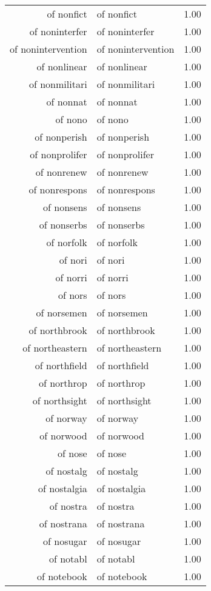 \begin{table}[ht]
\begin{tabular}{rlr}
  of nonfict & of nonfict & 1.00 \\ 
  of noninterfer & of noninterfer & 1.00 \\ 
  of nonintervention & of nonintervention & 1.00 \\ 
  of nonlinear & of nonlinear & 1.00 \\ 
  of nonmilitari & of nonmilitari & 1.00 \\ 
  of nonnat & of nonnat & 1.00 \\ 
  of nono & of nono & 1.00 \\ 
  of nonperish & of nonperish & 1.00 \\ 
  of nonprolifer & of nonprolifer & 1.00 \\ 
  of nonrenew & of nonrenew & 1.00 \\ 
  of nonrespons & of nonrespons & 1.00 \\ 
  of nonsens & of nonsens & 1.00 \\ 
  of nonserbs & of nonserbs & 1.00 \\ 
  of norfolk & of norfolk & 1.00 \\ 
  of nori & of nori & 1.00 \\ 
  of norri & of norri & 1.00 \\ 
  of nors & of nors & 1.00 \\ 
  of norsemen & of norsemen & 1.00 \\ 
  of northbrook & of northbrook & 1.00 \\ 
  of northeastern & of northeastern & 1.00 \\ 
  of northfield & of northfield & 1.00 \\ 
  of northrop & of northrop & 1.00 \\ 
  of northsight & of northsight & 1.00 \\ 
  of norway & of norway & 1.00 \\ 
  of norwood & of norwood & 1.00 \\ 
  of nose & of nose & 1.00 \\ 
  of nostalg & of nostalg & 1.00 \\ 
  of nostalgia & of nostalgia & 1.00 \\ 
  of nostra & of nostra & 1.00 \\ 
  of nostrana & of nostrana & 1.00 \\ 
  of nosugar & of nosugar & 1.00 \\ 
  of notabl & of notabl & 1.00 \\ 
  of notebook & of notebook & 1.00 \\ 

\end{tabular}
\end{table}
